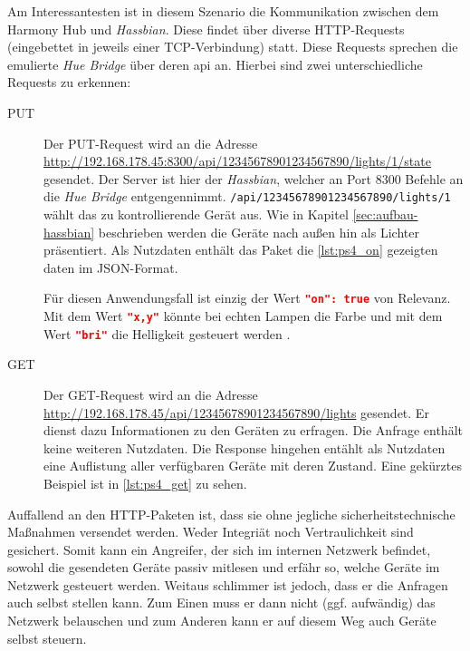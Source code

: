 Am Interessantesten ist in diesem Szenario die Kommunikation zwischen dem Harmony Hub und \textit{Hassbian}.
Diese findet über diverse HTTP-Requests (eingebettet in jeweils einer TCP-Verbindung) statt.
Diese Requests sprechen die emulierte \textit{Hue Bridge} über deren \ac{api} an.
Hierbei sind zwei unterschiedliche Requests zu erkennen:
\begin{description}
    \item[PUT]
        Der PUT-Request wird an die Adresse \url{http://192.168.178.45:8300/api/12345678901234567890/lights/1/state} gesendet.
        Der Server ist hier der \textit{Hassbian}, welcher an Port 8300 Befehle an die \textit{Hue Bridge} entgengennimmt.
        \texttt{/api/12345678901234567890/lights/1} wählt das zu kontrollierende Gerät aus.
        Wie in Kapitel \ref{sec:aufbau-hassbian} \textit{} beschrieben werden die Geräte nach außen hin als Lichter präsentiert.
        Als Nutzdaten enthält das Paket die \autoref{lst:ps4_on} gezeigten daten im JSON-Format.
        
        Für diesen Anwendungsfall ist einzig der Wert \lstinline[language=json]{"on": true} von Relevanz.
        Mit dem Wert \lstinline[language=json]{"x,y"} könnte bei echten Lampen die Farbe
        und mit dem Wert \lstinline[language=json]{"bri"} die Helligkeit gesteuert werden \cite{Coreconc26:online}.
    \item[GET]
        Der GET-Request wird an die Adresse \url{http://192.168.178.45/api/12345678901234567890/lights} gesendet.
        Er dienst dazu Informationen zu den Geräten zu erfragen.
        Die Anfrage enthält keine weiteren Nutzdaten.
        Die Response hingehen entählt als Nutzdaten eine Auflistung aller verfügbaren Geräte mit deren Zustand.
        Eine gekürztes Beispiel ist in \autoref{lst:ps4_get} zu sehen.
        
\end{description}

Auffallend an den HTTP-Paketen ist,
dass sie ohne jegliche sicherheitstechnische Maßnahmen versendet werden.
Weder Integriät noch Vertraulichkeit sind gesichert.
Somit kann ein Angreifer, der sich im internen Netzwerk befindet,
sowohl die gesendeten Geräte passiv mitlesen und erfähr so,
welche Geräte im Netzwerk gesteuert werden.
Weitaus schlimmer ist jedoch, dass er die Anfragen auch selbst stellen kann.
Zum Einen muss er dann nicht (ggf. aufwändig) das Netzwerk belauschen
und zum Anderen kann er auf diesem Weg auch Geräte selbst steuern.


